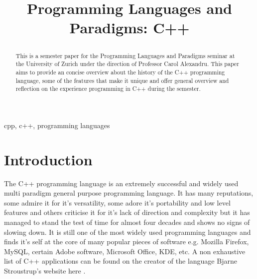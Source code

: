 \documentclass[conference, a4paper]{IEEEtran}
\begin{document}
\title{Programming Languages and Paradigms: C++

}

\author{
}

\maketitle

\begin{abstract}
This is a semester paper for the Programming Languages and Paradigms seminar at the University of Zurich under the direction of Professor Carol Alexandru. This paper aims to provide an concise overview about the history of the C++ programming language, some of the features that make it unique and offer general overview and reflection on the experience programming in C++ during the semester.\\
\end{abstract}

\begin{IEEEkeywords}
cpp, c++, programming languages
\end{IEEEkeywords}

\section{Introduction}
The C++ programming language is an extremely successful and widely used multi paradigm general purpose programming language. It has many reputations, some admire it for it's versatility, some adore it's portability and low level features and others criticise it for it's lack of direction and complexity but it has managed to stand the test of time for almost four decades and shows no signs of slowing down. It is still one of the most widely used programming languages and finds it's self at the core of many popular pieces of software e.g. Mozilla Firefox, MySQL, certain Adobe software, Microsoft Office, KDE, etc. A non exhaustive list of C++ applications can be found on the creator of the language Bjarne Stroustrup's website here \cite{cppapplications} .
\end{document}
